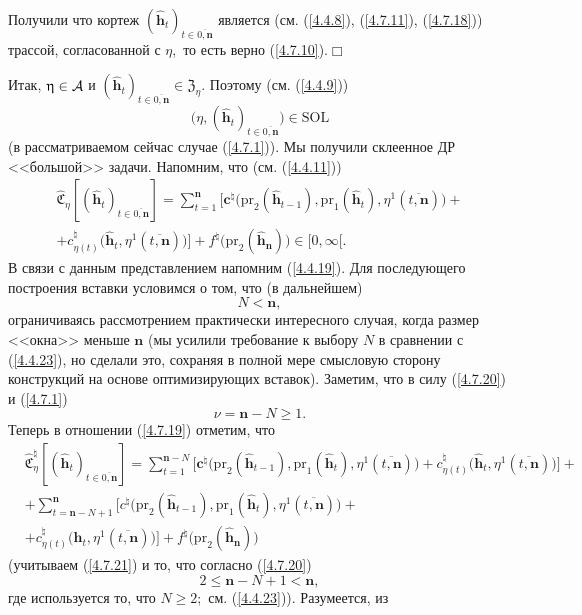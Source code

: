 \documentclass[11pt,twoside]{report}
\newcommand{\bfn}{\begin{equation}}
\newcommand{\efn}{\end{equation}}
\newcommand{\ov}{\overline}
\newcommand{\ca}{{\cal A}}
\newcommand{\zc}{{\mathbf c}}
\newcommand{\nn}{{\mathbf n}}
\begin{document}
{{Получили что кортеж $(\hat{\mathbf{h}}_t)_{t\in\ov{0,\nn}}$ является (см. (\ref{4.4.8}),
(\ref{4.7.11}), (\ref{4.7.18})) трассой, согласованной с $\eta,$ то есть
верно (\ref{4.7.10}).\hfill$\Box$

Итак, $\eta\in\ca$ и $(\hat{\mathbf{h}}_t)_{t\in\ov{0,\nn}}\in \mathfrak{Z}_\eta.$
Поэтому (см. (\ref{4.4.9}))
$$\bigl(\eta,(\hat{\mathbf{h}}_t)_{t\in\ov{0,\nn}}\bigl)\in \mathrm{SOL}
$$
(в рассматриваемом сейчас случае (\ref{4.7.1})). Мы получили склеенное ДР <<большой>>
задачи. Напомним, что (см. (\ref{4.4.11}))
\begin{eqnarray}
&\widehat{\mathfrak{C}}_\eta[(\hat{\mathbf{h}}_t)_{t\in\ov{0,\nn}}] =
\sum\limits_{t=1}^\nn\bigl[
\zc^\natural\bigl(\mathrm{pr}_2(\hat{\mathbf{h}}_{t-1}),\mathrm{pr}_1(\hat{\mathbf{h}}_t),
\eta^1(\ov{t,\nn})\bigl)+
&\nonumber\\
&+c_{\eta(t)}^\natural\bigl(\hat{\mathbf{h}}_t,
\eta^1(\ov{t,\nn})\bigl)\bigl] +f^\natural\bigl(\mathrm{pr}_2(\hat{\mathbf{h}}_\nn)\bigl)\in [0,\infty[.
\label{4.7.19}
\end{eqnarray}
В связи с данным представлением напомним (\ref{4.4.19}). Для последующего построения
вставки условимся о том, что (в дальнейшем)
\bfn\label{4.7.20}N < \nn,
\efn
ограничиваясь рассмотрением практически интересного случая, когда размер <<окна>>
меньше $\nn$ (мы усилили требование к выбору $N$ в сравнении с (\ref{4.4.23}), но
сделали это, сохраняя в полной мере смысловую сторону конструкций на основе
оптимизирующих вставок). Заметим, что в силу (\ref{4.7.20}) и (\ref{4.7.1})
\bfn\label{4.7.21}\nu = \nn-N \geqslant 1.
\efn
Теперь в отношении (\ref{4.7.19}) отметим, что
\begin{eqnarray}
&\widehat{\mathfrak{C}}_\eta^\natural[(\hat{\mathbf{h}}_t)_{t\in\ov{0,\nn}}] =
\sum\limits_{t=1}^{\nn-N}\bigl[
\zc^\natural\bigl(\mathrm{pr}_2(\hat{\mathbf{h}}_{t-1}),\mathrm{pr}_1(\hat{\mathbf{h}}_t),
\eta^1(\ov{t,\nn})\bigl)+ c_{\eta(t)}^\natural\bigl(\hat{\mathbf{h}}_t,\eta^1(\ov{t,\nn})\bigl)\bigl] +
&\nonumber\\
&+ \sum\limits_{t=\nn-N+1}^\nn\bigl[
c^\natural\bigl(\mathrm{pr}_2(\hat{\mathbf{h}}_{t-1}),\mathrm{pr}_1(\hat{\mathbf{h}}_t),
\eta^1(\ov{t,\nn})\bigl)+
&\nonumber\\
&+c_{\eta(t)}^\natural\bigl(\hat{\mathbf{h}}_t,\eta^1(\ov{t,\nn})\bigl)\bigl]
+f^\natural\bigl(\mathrm{pr}_2(\hat{\mathbf{h}}_\nn)\bigl)
&\label{4.7.22}
\end{eqnarray}
(учитываем (\ref{4.7.21}) и то, что согласно (\ref{4.7.20})
$$2 \leqslant \nn -N + 1 < \nn,
$$
где используется то, что $N \geqslant 2;$ см. (\ref{4.4.23})). Разумеется, из
}}
\end{document}
